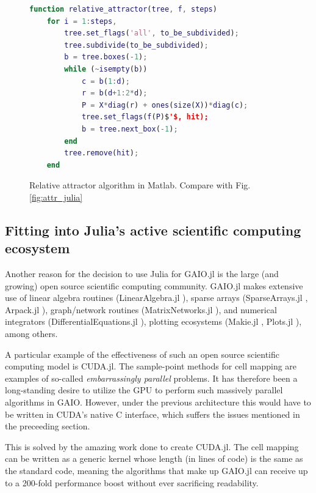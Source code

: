 \documentclass{juliacon}
\begin{document}
\begin{figure}
\begin{lstlisting}[language=Matlab,mathescape]
function relative_attractor(tree, f, steps)
    for i = 1:steps,
        tree.set_flags('all', to_be_subdivided); 
        tree.subdivide(to_be_subdivided);   
        b = tree.boxes(-1); 
        while (~isempty(b))
            c = b(1:d); 
            r = b(d+1:2*d);
            P = X*diag(r) + ones(size(X))*diag(c); 
            tree.set_flags(f(P)$'$, hit);          
            b = tree.next_box(-1);
        end
        tree.remove(hit);                         
    end
\end{lstlisting}
\caption{Relative attractor algorithm in Matlab. Compare with Fig. \ref{fig:attr_julia}}
\label{fig:attr_matlab}
\end{figure}

\subsection{Fitting into Julia's active scientific computing ecosystem}

Another reason for the decision to use Julia for GAIO.jl is the large (and growing) open source scientific computing community. GAIO.jl makes extensive use of linear algebra routines (LinearAlgebra.jl \cite{bezanson2017julia}), sparse arrays (SparseArrays.jl \cite{bezanson2017julia}, Arpack.jl \cite{arpack}), graph/network routines (MatrixNetworks.jl \cite{matrixnetworks}), and numerical integrators (DifferentialEquations.jl \cite{differentialequations}), plotting ecosystems (Makie.jl \cite{makie}, Plots.jl \cite{plots}), among others. 

A particular example of the effectiveness of such an open source scientific computing model is CUDA.jl. The sample-point methods for cell mapping are examples of so-called \emph{embarrassingly parallel} \cite{parallel} problems. It has therefore been a long-standing desire to utilize the GPU to perform such massively parallel algorithms in GAIO. However, under the previous architecture this would have to be written in CUDA's native C interface, which suffers the issues mentioned in the preceeding section. 

This is solved by the amazing work done to create CUDA.jl. The cell mapping can be written as a generic kernel whose length (in lines of code) is the same as the standard code, meaning the algorithms that make up GAIO.jl can receive up to a 200-fold \cite{gaiocuda} performance boost without ever sacrificing readability. 
\end{document}
